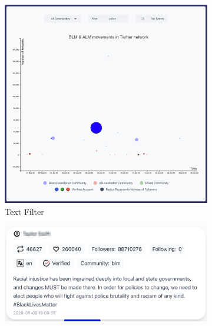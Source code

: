 \begin{figure}[H]

\begin{subfigure}{.5\textwidth}
  \centering
  \captionsetup{justification=centering}
  \includegraphics[width=1\linewidth]{Report-latex/tex_files/pics/example/obserp.png}  
 
  \caption{Text Filter}
  \label{fig:sub-second}
\end{subfigure}
\begin{subfigure}{.5\textwidth}
  \centering
  \captionsetup{justification=centering}
  \includegraphics[width=1\linewidth]{Report-latex/tex_files/pics/example/obserpb1.png}
  
  \\\
  

\end{subfigure}
\end{figure}
